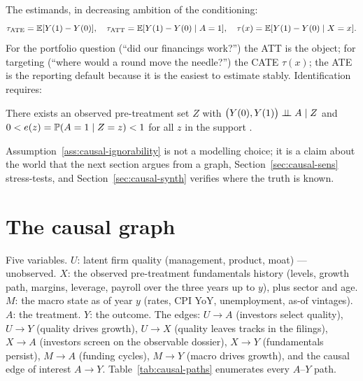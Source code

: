 The estimands, in decreasing ambition of the conditioning:
\begin{equation}
\tau_{\mathrm{ATE}} = \mathbb{E}[Y(1) - Y(0)], \quad
\tau_{\mathrm{ATT}} = \mathbb{E}[Y(1) - Y(0) \mid A = 1], \quad
\tau(x) = \mathbb{E}[Y(1) - Y(0) \mid X = x].
\label{eq:causal-estimands}
\end{equation}
For the portfolio question (``did our financings work?'') the ATT is the object; for
targeting (``where would a round move the needle?'') the CATE $\tau(x)$; the ATE is the
reporting default because it is the easiest to estimate stably. Identification requires:

\begin{assumption}
\label{ass:causal-ignorability}
There exists an observed pre-treatment set $Z$ with
$\bigl(Y(0), Y(1)\bigr) \perp\!\!\!\perp A \mid Z$ and
$0 < e(z) = \mathbb{P}(A = 1 \mid Z = z) < 1$ for all $z$ in the support
\cite{imbens2015,hernan2020}.
\end{assumption}

Assumption~\ref{ass:causal-ignorability} is not a modelling choice; it is a claim about
the world that the next section argues from a graph, Section~\ref{sec:causal-sens}
stress-tests, and Section~\ref{sec:causal-synth} verifies where the truth is known.

\section{The causal graph}
\label{sec:causal-dag}

Five variables. $U$: latent firm quality (management, product, moat) --- unobserved.
$X$: the observed pre-treatment fundamentals history (levels, growth path, margins,
leverage, payroll over the three years up to $y$), plus sector and age. $M$: the macro
state as of year $y$ (rates, CPI YoY, unemployment, as-of vintages). $A$: the treatment.
$Y$: the outcome. The edges: $U \to A$ (investors select quality), $U \to Y$ (quality
drives growth), $U \to X$ (quality leaves tracks in the filings), $X \to A$ (investors
screen on the observable dossier), $X \to Y$ (fundamentals persist), $M \to A$ (funding
cycles), $M \to Y$ (macro drives growth), and the causal edge of interest $A \to Y$.
Table~\ref{tab:causal-paths} enumerates every $A$--$Y$ path.

